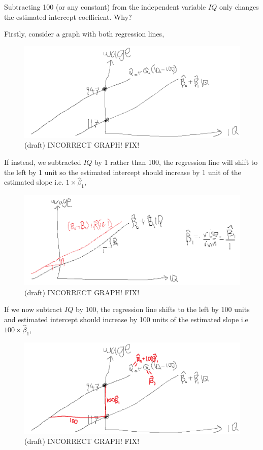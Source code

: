 \documentclass[12pt]{report}
\begin{document}
\noindent Subtracting 100 (or any constant) from the independent variable $IQ$ only changes the estimated intercept coefficient. Why?

\noindent Firstly, consider a graph with both regression lines,
\begin{figure}[H]
	\centerline{\includegraphics{q3_29}}
	\caption{(draft) INCORRECT GRAPH! FIX!}
\end{figure}
\noindent If instead, we subtracted $IQ$ by 1 rather than 100, the regression line will shift to the left by 1 unit so the estimated intercept should increase by 1 unit of the estimated slope i.e. $1\times\hat{\beta}_1$,
\begin{figure}[H]
	\centerline{\includegraphics{q3_30}}
	\caption{(draft) INCORRECT GRAPH! FIX!}
\end{figure}
\noindent If we now subtract $IQ$ by 100, the regression line shifts to the left by 100 units and estimated intercept should increase by 100 units of the estimated slope i.e $100\times\hat{\beta}_1$,
\begin{figure}[H]
	\centerline{\includegraphics{q3_31}}
	\caption{(draft) INCORRECT GRAPH! FIX!}
\end{figure}
\end{document}
